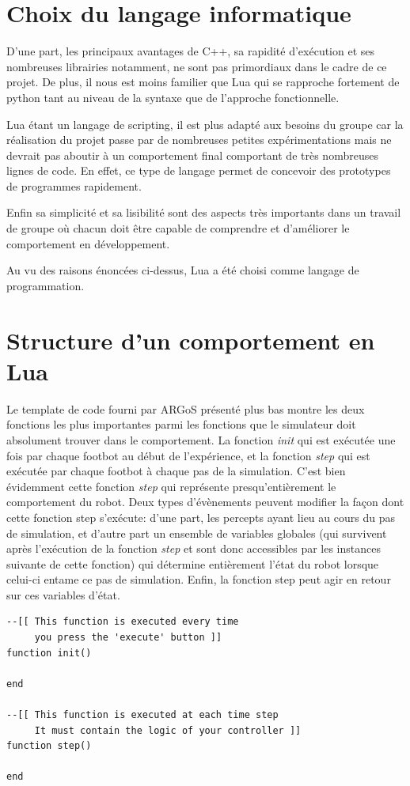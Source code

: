 \section{Choix du langage informatique}

D'une part, les principaux avantages de C++, sa rapidité d'exécution et ses nombreuses librairies notamment, ne sont pas primordiaux dans le cadre de ce projet. De plus, il nous est moins familier que Lua qui se rapproche fortement de python tant au niveau de la syntaxe que de l'approche fonctionnelle.

Lua étant un langage de scripting, il est plus adapté aux besoins du groupe car la réalisation du projet passe par de nombreuses petites expérimentations mais ne devrait pas aboutir à un comportement final comportant de très nombreuses lignes de code. En effet, ce type de langage permet de concevoir des prototypes de programmes rapidement.

Enfin sa simplicité et sa lisibilité sont des aspects très importants dans un travail de groupe où chacun doit être capable de comprendre et d'améliorer le comportement en développement.~\cite{compC++,compLua}

Au vu des raisons énoncées ci-dessus, Lua a été choisi comme langage de programmation.

\section{Structure d'un comportement en Lua}

Le template de code fourni par ARGoS présenté plus bas montre les deux fonctions les plus importantes parmi les fonctions que le simulateur doit absolument trouver dans le comportement. La fonction \emph{init} qui est exécutée une fois par chaque footbot au début de l'expérience, et la fonction \emph{step} qui est exécutée par chaque footbot à chaque pas de la simulation. C'est bien évidemment cette fonction \emph{step} qui représente presqu'entièrement le comportement du robot. Deux types d'évènements peuvent modifier la façon dont cette fonction step s'exécute: d'une part, les percepts ayant lieu au cours du pas de simulation, et d'autre part un ensemble de variables globales (qui survivent après l'exécution de la fonction \emph{step} et sont donc accessibles par les instances suivante de cette fonction) qui détermine entièrement l'état du robot lorsque celui-ci entame ce pas de simulation. Enfin, la fonction step peut agir en retour sur ces variables d'état.~\cite{argosSite1}
\begin{lstlisting}[caption=Structure de base d'un comportement en Lua]
--[[ This function is executed every time
     you press the 'execute' button ]]
function init()

end

--[[ This function is executed at each time step
     It must contain the logic of your controller ]]
function step()

end
\end{lstlisting}

